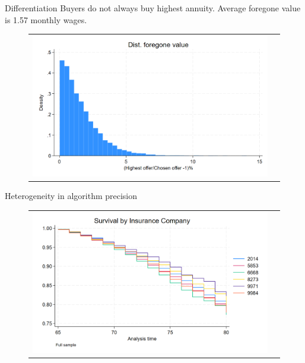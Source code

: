 \documentclass[10pt,aspectratio=169]{beamer}
\begin{document}
\begin{frame}{Differentiation}\label{slide:fig2}    
Buyers do not always buy highest annuity. Average foregone value is 1.57 monthly wages.
\begin{figure}[H]
\centering{}%
\begin{tabular}{cc}
\includegraphics[scale=0.25]{../figures/IE3_foregone_hist.png}
\end{tabular}
\end{figure}
\hyperlink{slide:Descriptive_evidence}{}
\end{frame}



\begin{frame}{Heterogeneity in algorithm precision}\label{slide:fig3}    
\begin{figure}[H]
\centering{}%
\begin{tabular}{cc}
\includegraphics[scale=0.264]{../figures/IE6/IE6_survival_year_all.png}
\end{tabular}
\end{figure}
\hyperlink{slide:Descriptive_evidence}{}
\end{frame}
\end{document}
